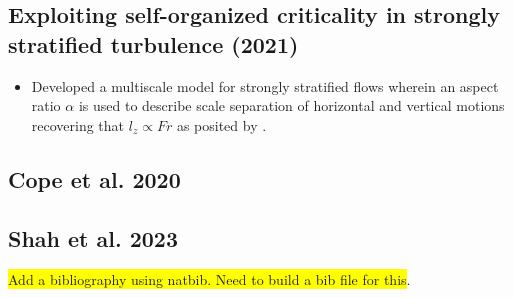 \documentclass{article}
\begin{document}
\subsection{Exploiting self-organized criticality in strongly stratified
turbulence (2021)}
\begin{itemize}
    \item Developed a multiscale model for strongly stratified flows wherein an
    aspect ratio $\alpha$ is used to describe scale separation of horizontal and
    vertical motions recovering that $l_z \propto Fr$ as posited by
    \cite{BillantChomaz2001}. 
\end{itemize}

\subsection{Cope et al. 2020}

\subsection{Shah et al. 2023}

\colorbox{yellow}{Add a bibliography using natbib. Need to build a bib file for this}. 
\end{document}

